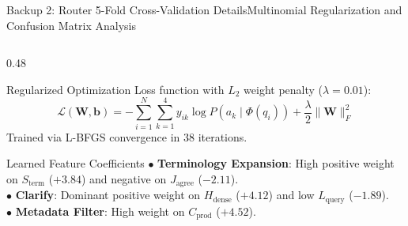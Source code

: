 \documentclass[aspectratio=169,10pt]{beamer}
\begin{document}
\begin{frame}{Backup 2: Router 5-Fold Cross-Validation Details}{Multinomial Regularization and Confusion Matrix Analysis}
  \begin{columns}[T]
    \begin{column}{0.48\textwidth}
      \begin{block}{Regularized Optimization}
        \scriptsize
        Loss function with $L_2$ weight penalty ($\lambda = 0.01$):
        \begin{equation*}
          \mathcal{L}(\mathbf{W}, \mathbf{b}) = -\sum_{i=1}^N \sum_{k=1}^4 y_{ik} \log P(a_k \mid \Phi(q_i)) + \frac{\lambda}{2} \|\mathbf{W}\|_F^2
        \end{equation*}
        Trained via L-BFGS convergence in 38 iterations.
      \end{block}

      \begin{block}{Learned Feature Coefficients}
        \scriptsize
        $\bullet$ \textbf{Terminology Expansion}: High positive weight on $S_{\text{term}}$ ($+3.84$) and negative on $J_{\text{agree}}$ ($-2.11$).\\
        $\bullet$ \textbf{Clarify}: Dominant positive weight on $H_{\text{dense}}$ ($+4.12$) and low $L_{\text{query}}$ ($-1.89$).\\
        $\bullet$ \textbf{Metadata Filter}: High weight on $C_{\text{prod}}$ ($+4.52$).
      \end{block}
    \end{column}


\end{columns}
\end{frame}
\end{document}
